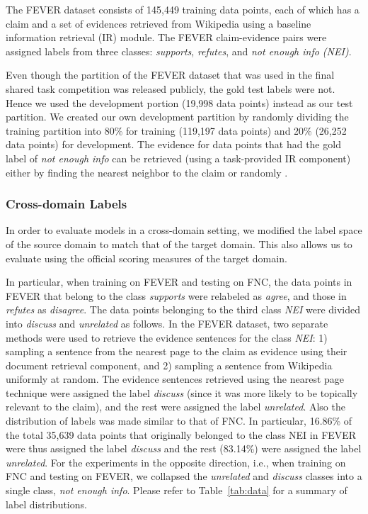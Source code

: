 {} The FEVER \citep{thorne2018fever} dataset consists of 145,449 training data points, each of which has a claim and a set of evidences retrieved from Wikipedia using a baseline information retrieval (IR) module.
The FEVER claim-evidence pairs were assigned labels from three classes: \textit{supports}, \textit{refutes}, and \textit{not enough info (NEI)}.

Even though the partition of the FEVER dataset that was used in the final shared task competition was released publicly, the gold test labels were not. Hence we used the development portion (19,998 data points) instead as our test partition. We created our own development partition by randomly dividing the training partition into 80\% for training (119,197 data points) and 20\% (26,252 data points) for development.  The evidence for data points that had the gold label of \textit{not enough info} can be retrieved (using a task-provided IR component) either by finding the nearest neighbor to the claim or randomly \citep{thorne2018fever}.


\subsubsection{Cross-domain Labels}
\label{sec:crossdomain}


In order to evaluate models in a cross-domain setting, we modified the label space of the source domain to match that of the target domain. This  also allows us to evaluate using the official scoring measures of the target domain.


In particular, when training on FEVER and testing on FNC, the data points in FEVER that belong to the class \textit{supports} were relabeled as \textit{agree}, and those in \textit{refutes} as \textit{disagree}. The data points belonging to the third class \textit{NEI} were divided into \textit{discuss} and \textit{unrelated} as follows.
In the FEVER dataset, two separate methods were used to retrieve the evidence sentences for the class \textit{NEI}: 1) sampling a sentence from the nearest page to the claim as evidence using their document retrieval component, and 2) sampling a sentence from Wikipedia uniformly at random. The evidence sentences retrieved using the nearest page technique were assigned the label \textit{discuss} (since it was more likely to be topically relevant to the claim), and the rest were assigned the label \textit{unrelated}. Also the distribution of labels was made similar to that of FNC. In particular, 16.86\% of the total 35,639 data points that originally belonged to the class NEI in FEVER were thus assigned the label \textit{discuss} and the rest (83.14\%) were assigned the label \textit{unrelated}. For the experiments in the opposite direction, i.e., when training on FNC and testing on FEVER, we collapsed the \textit{unrelated} and \textit{discuss} classes into a single class, \textit{not enough info}. Please refer to Table~\ref{tab:data} for a summary of label distributions.

